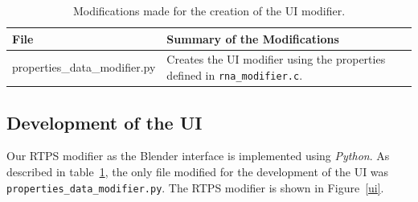 \begin{table}[htdp]
\caption{Modifications made for the creation of the UI modifier.}
\begin{center}
\begin{tabular}{|p{6cm}|p{6cm}|}
\hline 
\textbf{File} & \textbf{Summary of the Modifications} \\\hline 
properties\_data\_modifier.py & Creates the UI modifier using the properties defined in \texttt{rna\_modifier.c}. \\
\hline 
\end{tabular}
\end{center}
\label{uiTable}
\end{table}

\subsection{Development of the UI}
Our RTPS modifier as the Blender interface is implemented using \textit{Python}. As described in table~\ref{uiTable}, the only file modified for the development of the UI was \texttt{properties\_data\_modifier.py}. The RTPS modifier is shown in Figure~\ref{ui}.


